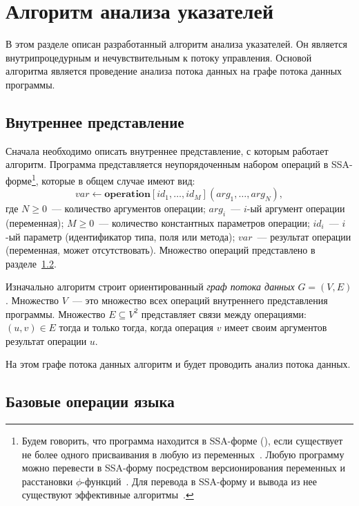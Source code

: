 \documentclass[14pt,titlepage,draft]{extarticle}
\newcommand{\java}{\eng{Java}\xspace}
\let\mathphi\phi
\renewcommand{\phi}{\ensuremath{\mathphi}}
\newcommand{\op}[1]{\mathbf{#1}}
\begin{document}
  \section{Алгоритм анализа указателей}

    В этом разделе описан разработанный алгоритм анализа указателей. Он является
    внутрипроцедурным и нечувствительным к потоку управления. Основой алгоритма
    является проведение анализа потока данных на графе потока данных программы.

  \subsection{Внутреннее представление}

    Сначала необходимо описать внутреннее представление, с которым работает
    алгоритм. Программа представляется неупорядоченным набором операций в
    SSA-форме\footnote{
      Будем говорить, что программа находится в SSA-форме (), если существует не более одного присваивания в любую из
      переменных~\cite{ssa}.
      Любую программу можно перевести в SSA-форму посредством
      версионирования переменных и расстановки \phi-функций~\cite{ssa}.
      Для перевода в SSA-форму и вывода из нее существуют эффективные
      алгоритмы~\cite{bilardi_ssa, briggs_ssa}.
    }, которые в общем случае имеют вид:
    \[ var \gets \op{operation}[id_1, \ldots, id_M](arg_1, \ldots, arg_N), \]
    где
    $N \geq 0$~--- количество аргументов операции;
    $arg_i$~--- $i$-ый аргумент операции (переменная);
    $M \geq 0$~--- количество константных параметров операции;
    $id_i$~--- $i$-ый параметр (идентификатор типа, поля или метода);
    $var$~--- результат операции (переменная, может отсутствовать).
    Множество операций представлено в разделе~\ref{section:ir_ops}.

    Изначально алгоритм строит ориентированный \emph{граф потока данных}
    $G = (V, E)$. Множество $V$~--- это множество всех операций внутреннего
    представления программы.
    Множество $E \subseteq V^2$ представляет связи между операциями:
    $(u, v) \in E$ тогда и только тогда, когда операция $v$ имеет своим
    аргументов результат операции $u$.

    На этом графе потока данных алгоритм и будет проводить анализ потока
    данных.

  \subsection{Базовые операции языка \texorpdfstring{\java}{Java}}
    \label{section:ir_ops}
\end{document}

